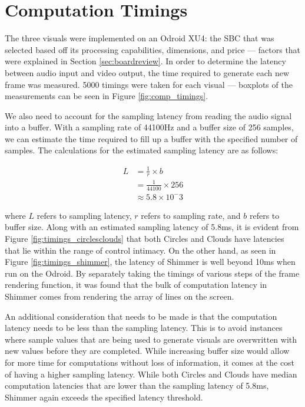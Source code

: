 \documentclass[../initial_thesis.tex]{subfiles}
\begin{document}
\section{Computation Timings} \label{sec:timings}
The three visuals were implemented on an Odroid XU4: the SBC that was selected based off its processing capabilities, dimensions, and price --- factors that were explained in Section \ref{sec:boardreview}. In order to determine the latency between audio input and video output, the time required to generate each new frame was measured. 5000 timings were taken for each visual --- boxplots of the measurements can be seen in Figure \ref{fig:comp_timings}.

We also need to account for the sampling latency from reading the audio signal into a buffer. With a sampling rate of 44100Hz and a buffer size of 256 samples, we can estimate the time required to fill up a buffer with the specified number of samples. The calculations for the estimated sampling latency are as follows:

\begin{align*}
  L &= \frac{1}{r} \times b\\
          &= \frac{1}{44100} \times 256\\
          &\approx 5.8 \times 10^-3
\end{align*}

where $L$ refers to sampling latency, $r$ refers to sampling rate, and $b$ refers to buffer size. Along with an estimated sampling latency of 5.8ms, it is evident from Figure \ref{fig:timings_circlesclouds} that both Circles and Clouds have latencies that lie within the range of control intimacy. On the other hand, as seen in Figure \ref{fig:timings_shimmer}, the latency of Shimmer is well beyond 10ms when run on the Odroid. By separately taking the timings of various steps of the frame rendering function, it was found that the bulk of computation latency in Shimmer comes from rendering the array of lines on the screen.

An additional consideration that needs to be made is that the computation latency needs to be less than the sampling latency. This is to avoid instances where sample values that are being used to generate visuals are overwritten with new values before they are completed. While increasing buffer size would allow for more time for computations without loss of information, it comes at the cost of having a higher sampling latency. While both Circles and Clouds have median computation latencies that are lower than the sampling latency of 5.8ms, Shimmer again exceeds the specified latency threshold.
\end{document}
